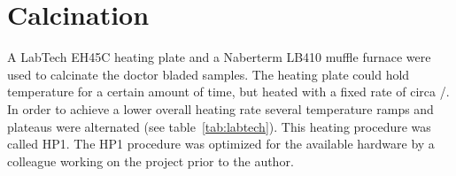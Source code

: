 \section{Calcination}\label{sec:exp-calc}
A LabTech EH45C heating plate and a Naberterm LB410 muffle furnace were used to calcinate 
the doctor bladed samples. 
The heating plate could hold temperature for a certain amount of time, but heated with a 
fixed rate of circa /\minutes{}.
In order to achieve a lower overall heating rate several temperature ramps and plateaus 
were alternated (see table~\ref{tab:labtech}). %
This heating procedure was called HP1.
The HP1 procedure was optimized for the available hardware by a colleague working on the 
project prior to the author.

